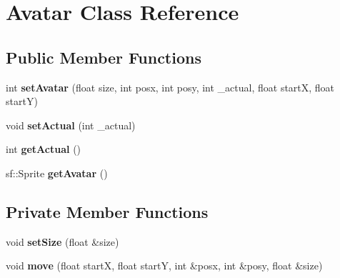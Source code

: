 \hypertarget{classAvatar}{}\section{Avatar Class Reference}
\label{classAvatar}
\subsection*{Public Member Functions}
\begin{DoxyCompactItemize}
\item 
int {\bfseries set\+Avatar} (float size, int posx, int posy, int \+\_\+actual, float startX, float startY)\hypertarget{classAvatar_a53ac52afe91523b08a05e41edb883e0b}{}\label{classAvatar_a53ac52afe91523b08a05e41edb883e0b}

\item 
void {\bfseries set\+Actual} (int \+\_\+actual)\hypertarget{classAvatar_a30f1705c0fe7164da51f3861bbbe83e7}{}\label{classAvatar_a30f1705c0fe7164da51f3861bbbe83e7}

\item 
int {\bfseries get\+Actual} ()\hypertarget{classAvatar_adcbefe8ab616aef752824f4dd6e86cb1}{}\label{classAvatar_adcbefe8ab616aef752824f4dd6e86cb1}

\item 
sf\+::\+Sprite {\bfseries get\+Avatar} ()\hypertarget{classAvatar_ac5fadc3a5a9c03ced147e34553cbce53}{}\label{classAvatar_ac5fadc3a5a9c03ced147e34553cbce53}

\end{DoxyCompactItemize}
\subsection*{Private Member Functions}
\begin{DoxyCompactItemize}
\item 
void {\bfseries set\+Size} (float \&size)\hypertarget{classAvatar_a3c7c3f25a0d5edc296636e716e6f91d4}{}\label{classAvatar_a3c7c3f25a0d5edc296636e716e6f91d4}

\item 
void {\bfseries move} (float startX, float startY, int \&posx, int \&posy, float \&size)\hypertarget{classAvatar_aaa3415318ec9f04c0b8a765c78faf4e5}{}\label{classAvatar_aaa3415318ec9f04c0b8a765c78faf4e5}

\end{DoxyCompactItemize}
